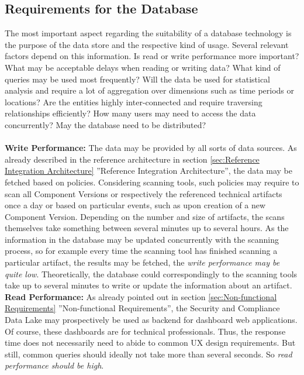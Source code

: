 \subsection{Requirements for the Database}
The most important aspect regarding the suitability of a database technology is the purpose of the data store and the respective kind of usage. Several relevant factors depend on this information. Is read or write performance more important? What may be acceptable delays when reading or writing data? What kind of queries may be used most frequently? Will the data be used for statistical analysis and require a lot of aggregation over dimensions such as time periods or locations? Are the entities highly inter-connected and require traversing relationships efficiently? How many users may need to access the data concurrently? May the database need to be distributed?\\\\
\textbf{Write Performance:} The data may be provided by all sorts of data sources. As already described in the reference architecture in section \ref{sec:Reference Integration Architecture} ''Reference Integration Architecture'', the data may be fetched based on policies. Considering scanning tools, such policies may require to scan all Component Versions or respectively the referenced technical artifacts once a day or based on particular events, such as upon creation of a new Component Version. Depending on the number and size of artifacts, the scans themselves take something between several minutes up to several hours. As the information in the database may be updated concurrently with the scanning process, so for example every time the scanning tool has finished scanning a particular artifact, the results may be fetched, the \emph{write performance may be quite low}. Theoretically, the database could correspondingly to the scanning tools take up to several minutes to write or update the information about an artifact.\\
\textbf{Read Performance:} As already pointed out in section \ref{sec:Non-functional Requirements} ''Non-functional Requirements'', the Security and Compliance Data Lake may prospectively be used as backend for dashboard web applications. Of course, these dashboards are for technical professionals. Thus, the response time does not necessarily need to abide to common UX design requirements. But still, common queries should ideally not take more than several seconds. So \emph{read performance should be high}.\\

